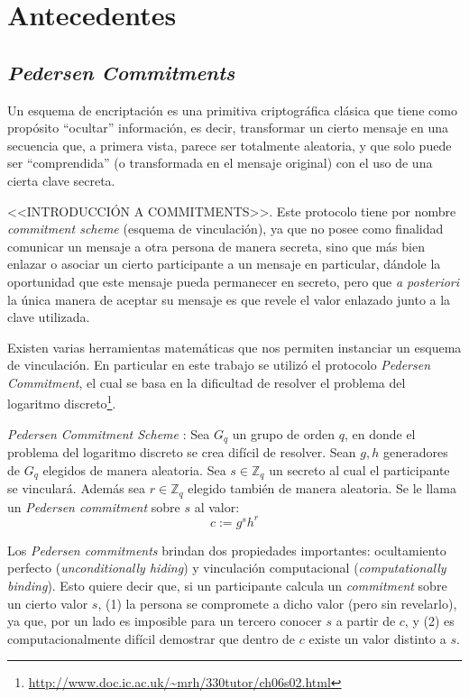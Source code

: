 \chapter{Antecedentes}\label{cap2}
\section{\emph{Pedersen Commitments}}

Un esquema de encriptación es una primitiva criptográfica clásica que tiene 
como propósito ``ocultar'' información, es decir, transformar un cierto 
mensaje en una secuencia que, a primera vista, parece ser totalmente 
aleatoria, y que solo puede ser ``comprendida'' (o transformada en el 
mensaje original) con el uso de una cierta clave secreta.

<<INTRODUCCIÓN A COMMITMENTS>>. Este protocolo tiene por nombre 
\emph{commitment scheme} (esquema de vinculación), ya que no posee como 
finalidad comunicar un mensaje a otra persona de manera secreta, sino que más 
bien enlazar o asociar un cierto participante a un mensaje en particular, 
dándole la oportunidad que este mensaje pueda permanecer en secreto, pero que 
\emph{a posteriori} la única manera de aceptar su 
mensaje es que revele el valor enlazado junto a la clave utilizada.

Existen varias herramientas matemáticas que nos permiten instanciar un 
esquema de vinculación. En particular en este 
trabajo se utilizó el protocolo 
\emph{Pedersen Commitment}\cite{pedersen1991non}, el cual se basa en la 
dificultad de resolver el problema del logaritmo 
discreto\footnote{\url{http://www.doc.ic.ac.uk/~mrh/330tutor/ch06s02.html}}.

\emph{Pedersen Commitment Scheme} \cite{pedersen1991non}: Sea $G_q$ un grupo 
de orden $q$, en donde el problema del logaritmo discreto se crea difícil 
de resolver. Sean $g,h$ generadores de $G_q$ elegidos de manera aleatoria. Sea 
$s \in \mathbb{Z}_q$ un secreto al cual el participante se vinculará. 
Además sea $r \in \mathbb{Z}_q$ elegido también de manera aleatoria. Se le 
llama un \emph{Pedersen commitment} sobre $s$ al valor: $$c := g^s h^r$$

Los \emph{Pedersen commitments} brindan dos propiedades importantes:  
ocultamiento perfecto (\emph{unconditionally hiding}) y 
vinculación computacional (\emph{computationally binding}). 
Esto quiere decir que, si un participante calcula un \emph{commitment} sobre 
un cierto valor $s$, (1) la persona se compromete a dicho valor (pero sin 
revelarlo), ya que, por un lado es imposible para un tercero conocer $s$ a 
partir de $c$, y (2) es computacionalmente difícil demostrar que dentro de $c$ 
existe un valor distinto a $s$.

